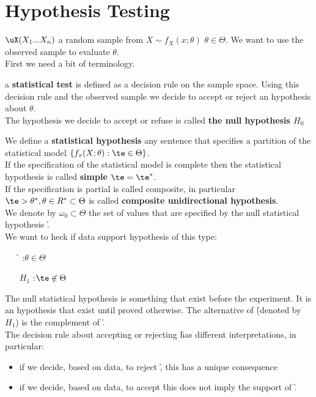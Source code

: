 \chapter{Hypothesis Testing}
\vspace{15pt}

$\uX(X_1 ... X_n)$ a random sample from $X\sim f_X(x;\theta)$ $\theta \in \Theta$. We want to use the observed sample to evaluate $\theta$.\\
First we need a bit of terminology.
\begin{defi}
	 a \textbf{statistical test} is defined as a decision rule on the sample space. Using this decision rule and the observed sample we decide to accept or reject an hypothesis about $\theta$.\\
	 The hypothesis we decide to accept or refuse is called \textbf{ the null hypothesis $H_0$} 
\end{defi} 
\begin{defi}
	We define a \textbf{statistical hypothesis} any sentence that specifies a partition of the statistical model $\{ f_x(X;\theta): \te \in \Theta \}$.\\If the specification of the statistical model is complete then the statistical hypothesis is called \textbf{simple $\te=\te^*$}.\\If the specification is partial is called composite, in particular $\te >\theta^*, \theta \in R^*\subset \Theta$ is called \textbf{composite unidirectional hypothesis}.\\
	We denote by $\omega_0 \subset \Theta$ the set of values that are specified by the null statistical hypothesis \h .\\
	We want	to heck if data support hypothesis of this type:
	\begin{itemize}
		\item[\h]:$\theta\in \Theta$
		\item[$H_1$]:$\te \not \in \Theta$
	\end{itemize}
\end{defi}
The null statistical hypothesis is something that exist before the experiment. It is an hypothesis that exist until proved otherwise. The alternative of \h (denoted by $H_1$) is the complement of \h.\\ The decision rule about accepting or rejecting \h has different interpretations, in particular:
\begin{itemize}
	\item if we decide, based on data, to reject \h, this has a unique consequence
	\item if we decide, based on data, to accept \h this does not imply the support of \h.
\end{itemize}
